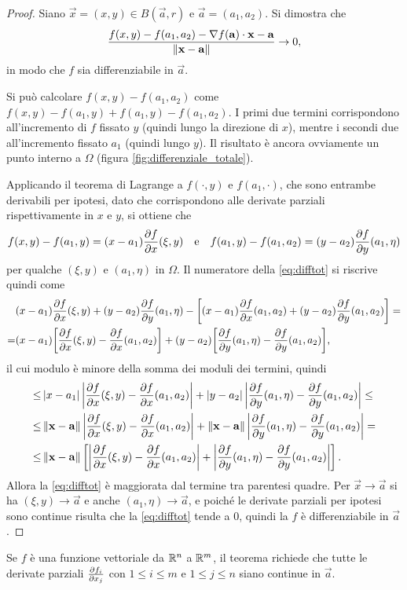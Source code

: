 \begin{proof}
Siano $\vec x=(x,y)\in B(\vec a,r)$ e $\vec a=(a_1,a_2)$. Si dimostra che
\begin{equation} \label{eq:difftot}
\frac{f(x,y)-f(a_1,a_2)-{\nabla f(\mathbf{a})}\cdot{\mathbf{x}-\mathbf{a}}}{\left\|{\mathbf{x}-\mathbf{a}}\right\|}\to 0,
\end{equation}
in modo che $f$ sia differenziabile in $\vec a$.

Si può calcolare $f(x,y)-f(a_1,a_2)$ come $f(x,y)-f(a_1,y)+f(a_1,y)-f(a_1,a_2)$. I primi due termini corrispondono all'incremento di $f$ fissato $y$ (quindi lungo la direzione di $x$), mentre i secondi due all'incremento fissato $a_1$ (quindi lungo $y$). Il risultato è ancora ovviamente un punto interno a $\Omega$ (figura \ref{fig:differenziale_totale}).

Applicando il teorema di Lagrange a $f(\cdot,y)$ e $f(a_1,\cdot)$, che sono entrambe derivabili per ipotesi, dato che corrispondono alle derivate parziali rispettivamente in $x$ e $y$, si ottiene che
\[
f(x,y)-f(a_1,y)=(x-a_1)\frac{\partial {f}}{\partial {x}}(\xi,y)\quad\text{e}\quad f(a_1,y)-f(a_1,a_2)=(y-a_2)\frac{\partial {f}}{\partial {y}}(a_1,\eta)
\]
per qualche $(\xi,y)$ e $(a_1,\eta)$ in $\Omega$.
Il numeratore della \eqref{eq:difftot} si riscrive quindi come
\begin{align*}
&(x-a_1)\frac{\partial {f}}{\partial {x}}(\xi,y)+(y-a_2)\frac{\partial {f}}{\partial {y}}(a_1,\eta)-\bigg[(x-a_1)\frac{\partial {f}}{\partial {x}}(a_1,a_2)+(y-a_2)\frac{\partial {f}}{\partial {y}}(a_1,a_2)\bigg]=\\
=&(x-a_1)\bigg[\frac{\partial {f}}{\partial {x}}(\xi,y)-\frac{\partial {f}}{\partial {x}}(a_1,a_2)\bigg]+(y-a_2)\bigg[\frac{\partial {f}}{\partial {y}}(a_1,\eta)-\frac{\partial {f}}{\partial {y}}(a_1,a_2)\bigg],
\end{align*}
il cui modulo è minore della somma dei moduli dei termini, quindi
\begin{align*}
\leq&\left|{x-a_1}\right|\left|{\frac{\partial {f}}{\partial {x}}(\xi,y)-\frac{\partial {f}}{\partial {x}}(a_1,a_2)}\right|+\left|{y-a_2}\right|\left|{\frac{\partial {f}}{\partial {y}}(a_1,\eta)-\frac{\partial {f}}{\partial {y}}(a_1,a_2)}\right|\leq\\
\leq&\left\|{\mathbf{x}-\mathbf{a}}\right\|\left|{\frac{\partial {f}}{\partial {x}}(\xi,y)-\frac{\partial {f}}{\partial {x}}(a_1,a_2)}\right|+\left\|{\mathbf{x}-\mathbf{a}}\right\|\left|{\frac{\partial {f}}{\partial {y}}(a_1,\eta)-\frac{\partial {f}}{\partial {y}}(a_1,a_2)}\right|=\\
\leq&\left\|{\mathbf{x}-\mathbf{a}}\right\|\left[\left|{\frac{\partial {f}}{\partial {x}}(\xi,y)-\frac{\partial {f}}{\partial {x}}(a_1,a_2)}\right|+\left|{\frac{\partial {f}}{\partial {y}}(a_1,\eta)-\frac{\partial {f}}{\partial {y}}(a_1,a_2)}\right|\right].
\end{align*}
Allora la \eqref{eq:difftot} è maggiorata dal termine tra parentesi quadre. Per $\vec x\to\vec a$ si ha $(\xi,y)\to\vec a$ e anche $(a_1,\eta)\to\vec a$, e poiché le derivate parziali per ipotesi sono continue risulta che la \eqref{eq:difftot} tende a 0, quindi la $f$ è differenziabile in $\vec a$.
\end{proof}
Se $f$ è una funzione vettoriale da $\mathbb{R}^n$ a $\mathbb{R}^m$, il teorema richiede che tutte le derivate parziali $\frac{\partial f_i}{\partial x_j}$ con $1\leq i\leq m$ e $1\leq j\leq n$ siano continue in $\vec a$.

